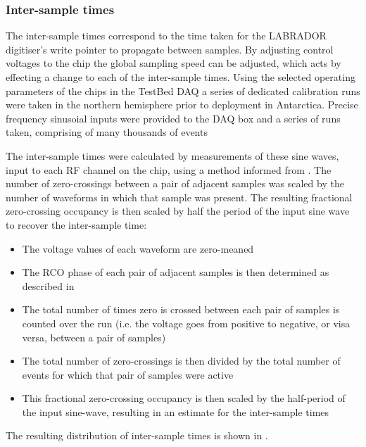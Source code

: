 \subsubsection{Inter-sample times}
\label{sec:calibration:LABRADOR-Digitiser-Chip:Inter-sample-times}

The inter-sample times correspond to the time taken for the LABRADOR digitiser's write pointer to propagate between samples. By adjusting control voltages to the chip the global sampling speed can be adjusted, which acts by effecting a change to each of the inter-sample times. Using the selected operating parameters of the chips in the TestBed DAQ a series of dedicated calibration runs were taken in the northern hemisphere prior to deployment in Antarctica. Precise frequency sinusoial inputs were provided to the DAQ box and a series of runs taken, comprising of many thousands of events

The inter-sample times were calculated by measurements of these sine waves, input to each RF channel on the chip, using a method informed from \cite{AbbyThesis}. The number of zero-crossings between a pair of adjacent samples was scaled by the number of waveforms in which that sample was present. The resulting fractional zero-crossing occupancy is then scaled by half the period of the input sine wave to recover the inter-sample time:

\begin{itemize}
\item The voltage values of each waveform are zero-meaned 
\item The RCO phase of each pair of adjacent samples is then determined as described in 
\item The total number of times zero is crossed between each pair of samples is counted over the run (i.e. the voltage goes from positive to negative, or visa versa, between a pair of samples)
\item The total number of zero-crossings is then divided by the total number of events for which that pair of samples were active
\item This fractional zero-crossing occupancy is then scaled by the half-period of the input sine-wave, resulting in an estimate for the inter-sample times
\end{itemize}


The resulting distribution of inter-sample times is shown in . 

